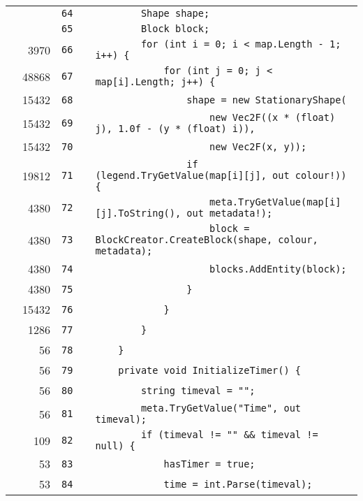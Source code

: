 \documentclass[a4paper,landscape,10pt]{article}
\begin{document}
\begin{longtable}[l]{lrrll}
\cellcolor{gray} &  & \verb~64~ & & \verb~        Shape shape;~\\
\cellcolor{gray} &  & \verb~65~ & & \verb~        Block block;~\\
\cellcolor{green} & 3970 & \verb~66~ & & \verb~        for (int i = 0; i < map.Length - 1; i++) {~\\
\cellcolor{green} & 48868 & \verb~67~ & & \verb~            for (int j = 0; j < map[i].Length; j++) {~\\
\cellcolor{green} & 15432 & \verb~68~ & & \verb~                shape = new StationaryShape(~\\
\cellcolor{green} & 15432 & \verb~69~ & & \verb~                    new Vec2F((x * (float) j), 1.0f - (y * (float) i)),~\\
\cellcolor{green} & 15432 & \verb~70~ & & \verb~                    new Vec2F(x, y));~\\
\cellcolor{green} & 19812 & \verb~71~ & & \verb~                if (legend.TryGetValue(map[i][j], out colour!)) {~\\
\cellcolor{green} & 4380 & \verb~72~ & & \verb~                    meta.TryGetValue(map[i][j].ToString(), out metadata!);~\\
\cellcolor{green} & 4380 & \verb~73~ & & \verb~                    block = BlockCreator.CreateBlock(shape, colour, metadata);~\\
\cellcolor{green} & 4380 & \verb~74~ & & \verb~                    blocks.AddEntity(block);~\\
\cellcolor{green} & 4380 & \verb~75~ & & \verb~                }~\\
\cellcolor{green} & 15432 & \verb~76~ & & \verb~            }~\\
\cellcolor{green} & 1286 & \verb~77~ & & \verb~        }~\\
\cellcolor{green} & 56 & \verb~78~ & & \verb~    }~\\
\cellcolor{green} & 56 & \verb~79~ & & \verb~    private void InitializeTimer() {~\\
\cellcolor{green} & 56 & \verb~80~ & & \verb~        string timeval = "";~\\
\cellcolor{green} & 56 & \verb~81~ & & \verb~        meta.TryGetValue("Time", out timeval);~\\
\cellcolor{orange} & 109 & \verb~82~ & & \verb~        if (timeval != "" && timeval != null) {~\\
\cellcolor{green} & 53 & \verb~83~ & & \verb~            hasTimer = true;~\\
\cellcolor{green} & 53 & \verb~84~ & & \verb~            time = int.Parse(timeval);~\\

\end{longtable}
\end{document}
